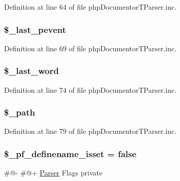 \-Definition at line 64 of file php\-Documentor\-T\-Parser.\-inc.

\hypertarget{classphp_documentor_t_parser_afbe9ac112fade65fc4a2eb649feedf5e}{
\subsubsection[{\$\-\_\-last\-\_\-pevent}]{\setlength{\rightskip}{0pt plus 5cm}\$\-\_\-last\-\_\-pevent}}\label{classphp_documentor_t_parser_afbe9ac112fade65fc4a2eb649feedf5e}


\-Definition at line 69 of file php\-Documentor\-T\-Parser.\-inc.

\hypertarget{classphp_documentor_t_parser_a345ee33ee73641df0d54f05e9e84f3fd}{
\subsubsection[{\$\-\_\-last\-\_\-word}]{\setlength{\rightskip}{0pt plus 5cm}\$\-\_\-last\-\_\-word}}\label{classphp_documentor_t_parser_a345ee33ee73641df0d54f05e9e84f3fd}


\-Definition at line 74 of file php\-Documentor\-T\-Parser.\-inc.

\hypertarget{classphp_documentor_t_parser_a7827e5ae727e96269db2e008bbfb9773}{
\subsubsection[{\$\-\_\-path}]{\setlength{\rightskip}{0pt plus 5cm}\$\-\_\-path}}\label{classphp_documentor_t_parser_a7827e5ae727e96269db2e008bbfb9773}


\-Definition at line 79 of file php\-Documentor\-T\-Parser.\-inc.

\hypertarget{classphp_documentor_t_parser_acb33ef4b7e35c788940acaefeb0ec1d0}{
\subsubsection[{\$\-\_\-pf\-\_\-definename\-\_\-isset}]{\setlength{\rightskip}{0pt plus 5cm}\$\-\_\-pf\-\_\-definename\-\_\-isset = false}}\label{classphp_documentor_t_parser_acb33ef4b7e35c788940acaefeb0ec1d0}
\#@-\/ \#@+ \hyperlink{class_parser}{\-Parser} \-Flags  private 

